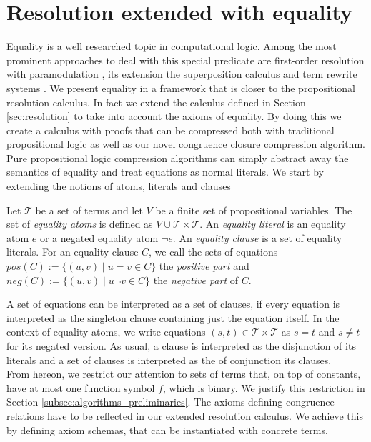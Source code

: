 \section{Resolution extended with equality}
\label{sec:calculus}

Equality is a well researched topic in computational logic.
Among the most prominent approaches to deal with this special predicate are first-order resolution with paramodulation \cite{Robinson1969}, its extension the superposition calculus \cite{Nieuwenhuis2001} and term rewrite systems \cite{Baader1998}.
We present equality in a framework that is closer to the propositional resolution calculus.
In fact we extend the calculus defined in Section \ref{sec:resolution} to take into account the axioms of equality.
By doing this we create a calculus with proofs that can be compressed both with traditional propositional logic as well as our novel congruence closure compression algorithm.
Pure propositional logic compression algorithms can simply abstract away the semantics of equality and treat equations as normal literals.
We start by extending the notions of atoms, literals and clauses

\begin{definition}

Let $\mathcal{T}$ be a set of terms and let $V$ be a finite set of propositional variables.
The set of \emph{equality atoms} is defined as $V \cup \mathcal{T} \times \mathcal{T}$.
An \emph{equality literal} is an equality atom $e$ or a negated equality atom $\neg e$.
An \emph{equality clause} is a set of equality literals.
For an equality clause $C$, we call the sets of equations $pos(C) := \{(u,v) \mid u = v \in C\}$ the \emph{positive part} and $neg(C) := \{(u,v) \mid u \neg v \in C\}$ the \emph{negative part} of $C$.

\end{definition}

A set of equations can be interpreted as a set of clauses, if every equation is interpreted as the singleton clause containing just the equation itself.
In the context of equality atoms, we write equations $(s,t) \in \mathcal{T} \times \mathcal{T}$ as $s = t$ and $s \neq t$ for its negated version.
As usual, a clause is interpreted as the disjunction of its literals and a set of clauses is interpreted as the of conjunction its clauses.\\

From hereon, we restrict our attention to sets of terms that, on top of constants, have at most one function symbol $f$, which is binary.
We justify this restriction in Section \ref{subsec:algorithms_preliminaries}.
The axioms defining congruence relations have to be reflected in our extended resolution calculus.
We achieve this by defining axiom schemas, that can be instantiated with concrete terms.

